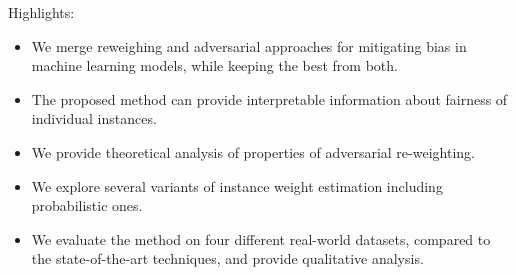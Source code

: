\documentclass[preprint,12pt,authoryear]{elsarticle}
\begin{document}
	
	\thispagestyle{empty}
	
	Highlights:	
	\begin{itemize}
		\item We merge reweighing and adversarial approaches for mitigating bias in machine learning models, while keeping the best from both.
		\item The proposed method can provide interpretable information about fairness of individual instances.
		\item We provide theoretical analysis of properties of adversarial re-weighting.
		\item We explore several variants of instance weight estimation including probabilistic ones.
		\item We evaluate the method on four different real-world datasets, compared to the state-of-the-art techniques, and provide qualitative analysis.
	\end{itemize}
		
\end{document}
